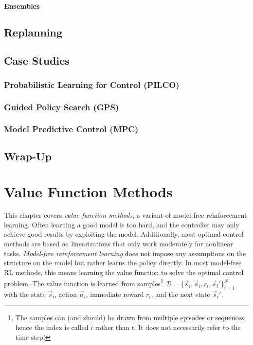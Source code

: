			\subsubsection{Ensembles} %

	\section{Replanning} %

	\section{Case Studies} %

		\subsection{Probabilistic Learning for Control (PILCO)} %

		\subsection{Guided Policy Search (GPS)} %

		\subsection{Model Predictive Control (MPC)} %

	\section{Wrap-Up} %

\chapter{Value Function Methods}
	\label{c:valueFunctionMethods}

	This chapter covers \emph{value function methods}, a variant of model-free reinforcement learning. Often learning a good model is too hard, and the controller may only achieve good results by exploiting the model. Additionally, most optimal control methods are based on linearizations that only work moderately for nonlinear tasks. \emph{Model-free reinforcement learning} does not impose any assumptions on the structure on the model but rather learns the policy directly. In most model-free RL methods, this means learning the value function to solve the optimal control problem. The value function is learned from samples\footnote{The samples can (and should) be drawn from multiple episodes or sequences, hence the index is called \(i\) rather than \(t\). It does not necessarily refer to the time step!} \( \mathcal{D} = \big\{ \vec{s}_i, \vec{a}_i, r_i, \vec{s}_i' \}_{i = 1}^{N} \) with the state \(\vec{s}_i\), action \(\vec{a}_i\), immediate reward \(r_i\), and the next state \(\vec{s}_i'\).

